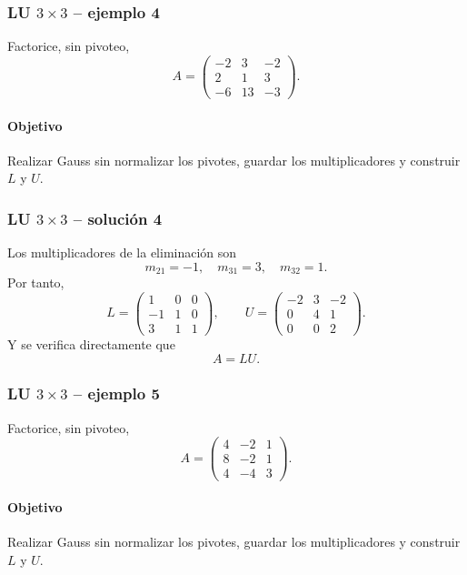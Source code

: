 \subsubsection*{LU $3\times 3$ -- ejemplo 4}

Factorice, sin pivoteo,
\[
A=\begin{pmatrix}-2 & 3 & -2\\2 & 1 & 3\\-6 & 13 & -3\end{pmatrix}.
\]

\paragraph{Objetivo}
Realizar Gauss sin normalizar los pivotes, guardar los multiplicadores y construir $L$ y $U$.



\subsubsection*{LU $3\times 3$ -- solución 4}

Los multiplicadores de la eliminación son
\[
m_{21}=-1,\quad m_{31}=3,\quad m_{32}=1.
\]
Por tanto,
\[
L=\begin{pmatrix}1 & 0 & 0\\-1 & 1 & 0\\3 & 1 & 1\end{pmatrix},\qquad U=\begin{pmatrix}-2 & 3 & -2\\0 & 4 & 1\\0 & 0 & 2\end{pmatrix}.
\]
Y se verifica directamente que
\[
\boxed{A=LU}.
\]


\subsubsection*{LU $3\times 3$ -- ejemplo 5}

Factorice, sin pivoteo,
\[
A=\begin{pmatrix}4 & -2 & 1\\8 & -2 & 1\\4 & -4 & 3\end{pmatrix}.
\]

\paragraph{Objetivo}
Realizar Gauss sin normalizar los pivotes, guardar los multiplicadores y construir $L$ y $U$.



